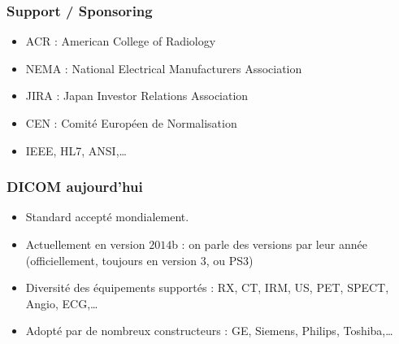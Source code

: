 	\frame
	{
		\frametitle{Support / Sponsoring}
		\begin{itemize}
			\item ACR : American College of Radiology
			\item NEMA : National Electrical Manufacturers Association
			\item JIRA : Japan Investor Relations Association
			\item CEN : Comit\'e Europ\'een de Normalisation
			\item IEEE, HL7, ANSI,\ldots
		\end{itemize}
	}

	\frame
	{
		\frametitle{DICOM aujourd'hui}
		\begin{itemize}
			\item Standard accept\'e mondialement.
			\item Actuellement en version $2014$b : on parle des versions par leur ann\'ee (officiellement, toujours en version 3, ou PS3)
			\item Diversit\'e des \'equipements support\'es : RX, CT, IRM, US, PET, SPECT, Angio, ECG,\ldots
			\item Adopt\'e par de nombreux constructeurs : GE, Siemens, Philips, Toshiba,\ldots
		\end{itemize}
	}
